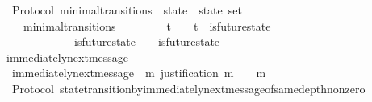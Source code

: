 \begin{isabellebody}
%
\endisadelimproof
\isanewline
\isanewline
{}\isamarkupfalse%
\ {\isacharparenleft}\ Protocol{\isacharparenright}\ minimal{\isacharunderscore}transitions\ {\isacharcolon}{\isacharcolon}\ {\isachardoublequoteopen}{\isacharparenleft}state\ {\isacharasterisk}\ state{\isacharparenright}\ set{\isachardoublequoteclose}\isanewline
\ \ \isanewline
\ \ \ \ {\isachardoublequoteopen}minimal{\isacharunderscore}transitions\ {\isasymequiv}\ {\isacharbraceleft}{\isacharparenleft}{\isasymsigma}{\isacharcomma}\ {\isasymsigma}{\isacharprime}{\isacharparenright}\ {\isacharbar}\ {\isasymsigma}\ {\isasymsigma}{\isacharprime}{\isachardot}\ {\isasymsigma}\ {\isasymin}\ {\isasymSigma}t\ {\isasymand}\ {\isasymsigma}{\isacharprime}\ {\isasymin}\ {\isasymSigma}t\ {\isasymand}\ is{\isacharunderscore}future{\isacharunderscore}state\ {\isacharparenleft}{\isasymsigma}{\isacharcomma}\ {\isasymsigma}{\isacharprime}{\isacharparenright}\ {\isasymand}\ {\isasymsigma}\ {\isasymnoteq}\ {\isasymsigma}{\isacharprime}\isanewline
\ \ \ \ \ \ {\isasymand}\ {\isacharparenleft}{\isasymnexists}\ {\isasymsigma}{\isacharprime}{\isacharprime}{\isachardot}\ {\isasymsigma}{\isacharprime}{\isacharprime}\ {\isasymin}\ {\isasymSigma}\ {\isasymand}\ is{\isacharunderscore}future{\isacharunderscore}state\ {\isacharparenleft}{\isasymsigma}{\isacharcomma}\ {\isasymsigma}{\isacharprime}{\isacharprime}{\isacharparenright}\ {\isasymand}\ is{\isacharunderscore}future{\isacharunderscore}state\ {\isacharparenleft}{\isasymsigma}{\isacharprime}{\isacharprime}{\isacharcomma}\ {\isasymsigma}{\isacharprime}{\isacharparenright}\ {\isasymand}\ {\isasymsigma}\ {\isasymnoteq}\ {\isasymsigma}{\isacharprime}{\isacharprime}\ {\isasymand}\ {\isasymsigma}{\isacharprime}{\isacharprime}\ {\isasymnoteq}\ {\isasymsigma}{\isacharprime}{\isacharparenright}{\isacharbraceright}{\isachardoublequoteclose}\isanewline
\isanewline
\isanewline
{}\isamarkupfalse%
\ immediately{\isacharunderscore}next{\isacharunderscore}message\ \isanewline
\ \ {\isachardoublequoteopen}immediately{\isacharunderscore}next{\isacharunderscore}message\ {\isacharequal}\ {\isacharparenleft}{\isasymlambda}{\isacharparenleft}{\isasymsigma}{\isacharcomma}m{\isacharparenright}{\isachardot}\ justification\ m\ {\isasymsubseteq}\ {\isasymsigma}\ {\isasymand}\ m\ {\isasymnotin}\ {\isasymsigma}{\isacharparenright}{\isachardoublequoteclose}\isanewline
\isanewline
{}\isamarkupfalse%
\ {\isacharparenleft}\ Protocol{\isacharparenright}\ state{\isacharunderscore}transition{\isacharunderscore}by{\isacharunderscore}immediately{\isacharunderscore}next{\isacharunderscore}message{\isacharunderscore}of{\isacharunderscore}same{\isacharunderscore}depth{\isacharunderscore}non{\isacharunderscore}zero{\isacharcolon}\ \isanewline

\end{isabellebody}
